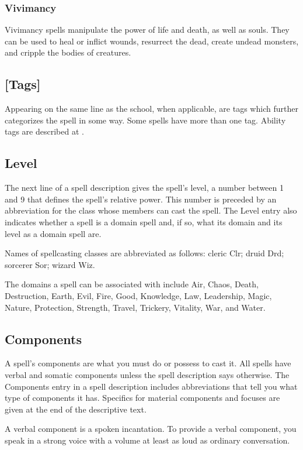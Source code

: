         \subsubsection{Vivimancy}
            Vivimancy spells manipulate the power of life and death, as well as souls. They can be used to heal or inflict wounds, resurrect the dead, create undead monsters, and cripple the bodies of creatures.

    \subsection{[Tags]}
        Appearing on the same line as the school, when applicable, are tags which further categorizes the spell in some way. Some spells have more than one tag. Ability tags are described at .

    \subsection{Level}
        The next line of a spell description gives the spell's level, a number between 1 and 9 that defines the spell's relative power. This number is preceded by an abbreviation for the class whose members can cast the spell. The Level entry also indicates whether a spell is a domain spell and, if so, what its domain and its level as a domain spell are.

        Names of spellcasting classes are abbreviated as follows: cleric Clr; druid Drd; sorcerer Sor; wizard Wiz.

        The domains a spell can be associated with include Air, Chaos, Death, Destruction, Earth, Evil, Fire, Good, Knowledge, Law, Leadership, Magic, Nature, Protection, Strength, Travel, Trickery, Vitality, War, and Water.

    \subsection{Components}\label{Components}
        A spell's components are what you must do or possess to cast it. All spells have verbal and somatic components unless the spell description says otherwise. The Components entry in a spell description includes abbreviations that tell you what type of components it has. Specifics for material components and focuses are given at the end of the descriptive text.

         A verbal component is a spoken incantation. To provide a verbal component, you speak in a strong voice with a volume at least as loud as ordinary conversation.

